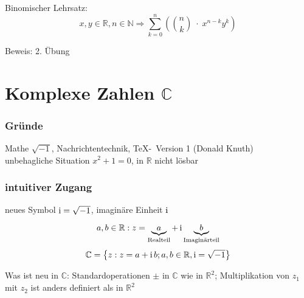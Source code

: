 \begin{proposition} Binomischer Lehrsatz:
 \begin{equation*} x,y \in \mathbb{R}, n \in \mathbb{N} \Rightarrow \sum_{k=0}^n \left( {n \choose k} \;\cdot\; x^{n-k}y^k \right) \end{equation*}
\end{proposition}
%
Beweis: 2. Übung

\section{Komplexe Zahlen $\mathbb{C}$}

\subsubsection*{Gründe}

Mathe $\sqrt{-1}$, Nachrichtentechnik, \TeX-\MF\  Version 1 (Donald Knuth)\\
unbehagliche Situation $x^2+1=0$, in $\mathbb{R}$ nicht lösbar

\subsubsection*{intuitiver Zugang}

neues Symbol $\operatorname{i} = \sqrt{-1}$, imaginäre Einheit $\operatorname{i}$

\begin{definition}
  \begin{equation*} a, b \in \mathbb{R}: z = \underbrace{a}_\text{Realteil} + \operatorname{i} \underbrace{b}_\text{Imaginärteil} \end{equation*}
  \begin{equation*} \mathbb{C} = \left\{ z : z = a+\operatorname{i} b; a,b \in \mathbb{R}, \operatorname{i} = \sqrt{-1} \right\} \end{equation*}
\end{definition}
%
Was ist neu in $\mathbb{C}$: Standardoperationen $\pm$ in $\mathbb{C}$ wie in $\mathbb{R}^2$; Multiplikation von $z_1$ mit $z_2$ ist anders definiert als in $\mathbb{R}^2$